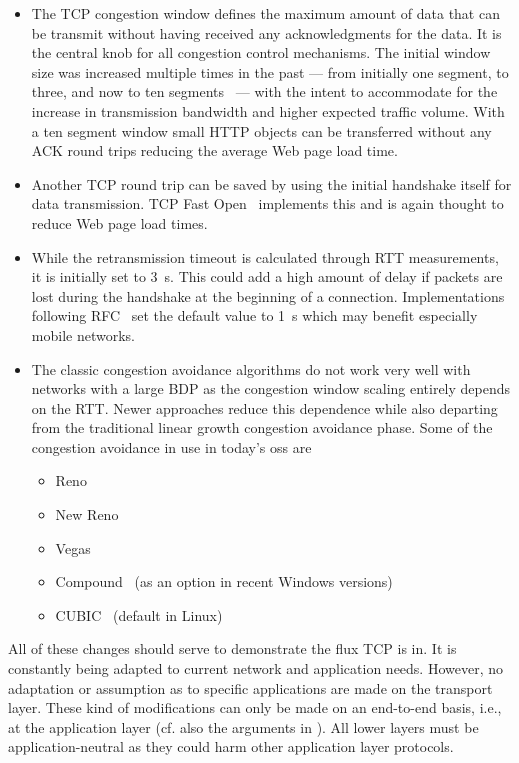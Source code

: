 \begin{itemize}
	\item The \gls{TCP} congestion window defines the maximum amount of data that can be transmit without having received any acknowledgments for the data. It is the central knob for all congestion control mechanisms.
	The initial window size was increased multiple times in the past --- from initially one segment, to three, and now to ten segments~\cite{rfc6928} ---  with the intent to accommodate for the increase in transmission bandwidth and higher expected traffic volume. With a ten segment window small \gls{HTTP} objects can be transferred without any ACK round trips reducing the average Web page load time.

	\item Another \gls{TCP} round trip can be saved by using the initial handshake itself for data transmission. \gls{TCP} Fast Open~\cite{cheng2014tcptfo} implements this and is again thought to reduce Web page load times.

	\item While the retransmission timeout is calculated through \gls{RTT} measurements, it is initially set to \SI{3}{\second}. This could add a high amount of delay if packets are lost during the handshake at the beginning of a connection. Implementations following RFC~\cite{rfc6298} set the default value to \SI{1}{\second} which may benefit especially mobile networks.

	\item The classic congestion avoidance algorithms do not work very well with networks with a large \gls{BDP} as the congestion window scaling entirely depends on the \gls{RTT}. Newer approaches reduce this dependence while also departing from the traditional linear growth congestion avoidance phase. Some of the congestion avoidance in use in today's \glspl{os} are 
		\begin{itemize}
			\item Reno~\cite{rfc5681}
			\item New Reno~\cite{rfc6582}
			\item Vegas~\cite{Brakmo:1994:TVN:190809.190317}
			\item Compound~\cite{song2006compound} (as an option in recent Windows versions)
			\item CUBIC~\cite{ha2008cubic} (default in Linux)
		\end{itemize}
\end{itemize}


All of these changes should serve to demonstrate the flux \gls{TCP} is in. It is constantly being adapted to current network and application needs. However, no adaptation or assumption as to specific applications are made on the transport layer. These kind of modifications can only be made on an end-to-end basis, i.e., at the application layer (cf. also the arguments in \cite{saltzer1984end2end}). All lower layers must be application-neutral as they could harm other application layer protocols.

